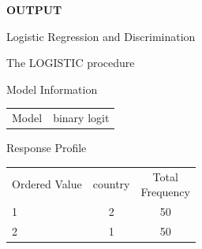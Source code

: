 \begin{mvbox}
{\ttfamily\small
\hfill\textbf{OUTPUT}\\
\par\vspace{6pt}
{\centering\small Logistic Regression and Discrimination\par}
\vspace{4pt}
{\centering\small The LOGISTIC procedure\par}
\vspace{8pt}
{\centering\small Model Information\par}
\vspace{4pt}
{\centering\small
\begin{tabular}{ll}
Model & binary logit\\
\end{tabular}\par}
\vspace{8pt}
{\centering\small Response Profile\par}
\vspace{4pt}
{\centering\small
\begin{tabular}{lcc}
Ordered Value & country & \makecell{Total\\Frequency}\\
1 & 2 & 50\\
2 & 1 & 50\\
\end{tabular}\par}
\par}
\end{mvbox}
